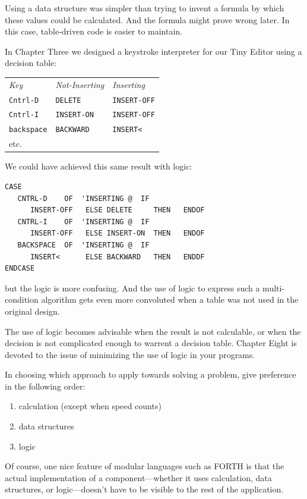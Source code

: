 Using a data structure was simpler than trying to invent a formula by
which these values could be calculated. And the formula might prove
wrong later. In this case, table-driven code is easier to maintain.

In Chapter Three we designed a keystroke interpreter for our Tiny
Editor using a decision table:

\begin{tabular}{lll}
\emph{Key}         & \emph{Not-Inserting} & \emph{Inserting} \\
\texttt{Cntrl-D}   & \texttt{DELETE}      & \texttt{INSERT-OFF} \\
\texttt{Cntrl-I}   & \texttt{INSERT-ON}   & \texttt{INSERT-OFF} \\
\texttt{backspace} & \texttt{BACKWARD}    & \texttt{INSERT<} \\
etc. & &
\end{tabular}

We could have achieved this same result with logic:

\begin{verbatim}
CASE
   CNTRL-D    OF  'INSERTING @  IF
      INSERT-OFF   ELSE DELETE     THEN   ENDOF
   CNTRL-I    OF  'INSERTING @  IF
      INSERT-OFF   ELSE INSERT-ON  THEN   ENDOF
   BACKSPACE  OF  'INSERTING @  IF
      INSERT<      ELSE BACKWARD   THEN   ENDDF
ENDCASE
\end{verbatim}
but the logic is more confusing. And the use of logic to express such a
multi-condition algorithm gets even more convoluted when a table was
not used in the original design.

The use of logic becomes advisable when the result is not calculable,
or when the decision is not complicated enough to warrent a decision
table. Chapter Eight is devoted to the issue of minimizing the use of logic
in your programs.

\begin{tip}
In choosing which approach to apply towards solving a problem, give
preference in the following order:

\begin{enumerate}
\item calculation (except when speed counts)
\item data structures
\item logic
\end{enumerate}
\end{tip}
Of course, one nice feature of modular languages such as FORTH is that
the actual implementation of a component---whether it uses calculation,
data structures, or logic---doesn't have to be visible to the rest of the
application.

